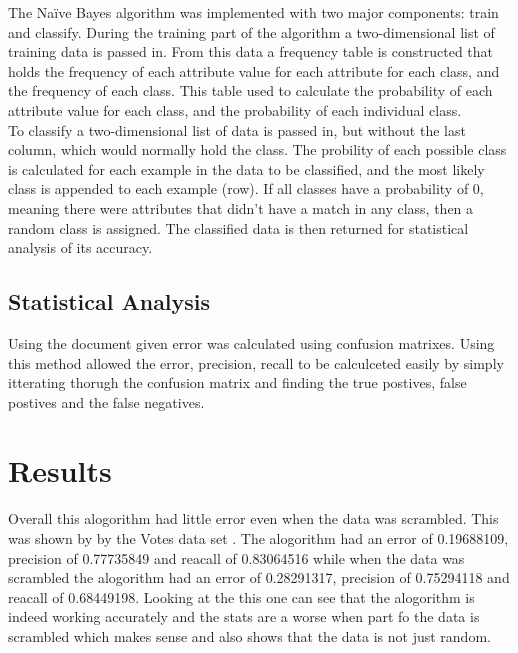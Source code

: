 \documentclass[twoside,11pt]{article}
\begin{document}
The Naïve Bayes algorithm was implemented with two major components: train and classify. 
During the training part of the algorithm a two-dimensional list of training data is passed in.
From this data a frequency table is constructed that holds the frequency of each attribute value for each attribute for each class, and the frequency of each class. 
This table used to calculate the probability of each attribute value for each class, and the probability of each individual class.\\
To classify a two-dimensional list of data is passed in, but without the last column, which would normally hold the class.
The probility of each possible class is calculated for each example in the data to be classified, 
and the most likely class is appended to each example (row).
 If all classes have a probability of 0, meaning there were attributes that didn't have a match in any class, then a random class is assigned.
The classified data is then returned for statistical analysis of its accuracy.

\subsection{Statistical Analysis}
Using the document given \citep{Precision} error was calculated using confusion matrixes.
Using this method allowed the error, precision, recall to be calculceted easily by simply
itterating thorugh the confusion matrix and finding the true postives, false postives and the 
false negatives.


\section{Results}
Overall this  alogorithm had little error even when the data was scrambled.  
This was shown by by the Votes data set \citep{Vote}. The alogorithm had an error of 0.19688109, precision of 0.77735849
and reacall of 0.83064516 while when the data was scrambled the alogorithm had an error of 0.28291317, precision 
of 0.75294118 and reacall of 0.68449198.  Looking at the this one can see that the alogorithm is indeed working accurately
and the stats are a worse when part fo the data is scrambled which makes sense and also shows that the data is not just 
random. 




\newpage





\vskip 0.2in

\end{document}
